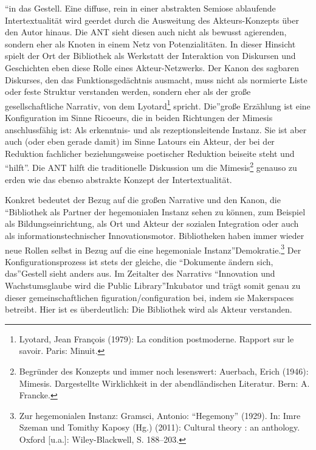 \enquote{in das Gestell. Eine diffuse, rein in einer abstrakten Semiose
ablaufende Intertextualität wird geerdet durch die Ausweitung des
Akteurs-Konzepts über den Autor hinaus. Die ANT sieht diesen auch nicht
als bewusst agierenden, sondern eher als Knoten in einem Netz von
Potenzialitäten. In dieser Hinsicht spielt der Ort der Bibliothek als
Werkstatt der Interaktion von Diskursen und Geschichten eben diese Rolle
eines Akteur-Netzwerks. Der Kanon des sagbaren Diskurses, den das
Funktionsgedächtnis ausmacht, muss nicht als normierte Liste oder feste
Struktur verstanden werden, sondern eher als der große gesellschaftliche
Narrativ, von dem Lyotard\footnote{Lyotard, Jean François (1979): La
  condition postmoderne. Rapport sur le savoir. Paris: Minuit.} spricht.
Die}große Erzählung ist eine Konfiguration im Sinne Ricoeurs, die in
beiden Richtungen der Mimesis anschlussfähig ist: Als erkenntnis- und
als rezeptionsleitende Instanz. Sie ist aber auch (oder eben gerade
damit) im Sinne Latours ein Akteur, der bei der Reduktion fachlicher
beziehungsweise poetischer Reduktion beiseite steht und \enquote{hilft}. Die ANT
hilft die traditionelle Diskussion um die Mimesis\footnote{Begründer des
  Konzepts und immer noch lesenswert: Auerbach, Erich (1946): Mimesis.
  Dargestellte Wirklichkeit in der abendländischen Literatur. Bern: A.
  Francke.} genauso zu erden wie das ebenso abstrakte Konzept der
Intertextualität.

Konkret bedeutet der Bezug auf die großen Narrative und den Kanon, die
\enquote{Bibliothek als Partner der hegemonialen Instanz sehen zu
können, zum Beispiel als Bildungseinrichtung, als Ort und Akteur der
sozialen Integration oder auch als informationstechnischer
Innovationsmotor. Bibliotheken haben immer wieder neue Rollen selbst in
Bezug auf die eine hegemoniale Instanz}Demokratie.\footnote{Zur
  hegemonialen Instanz: Gramsci, Antonio: \enquote{Hegemony} (1929). In:
  Imre Szeman und Tomithy Kaposy (Hg.) (2011): Cultural theory : an
  anthology. Oxford {[}u.a.{]}: Wiley-Blackwell, S. 188--203.} Der
Konfigurationsprozess ist stets der gleiche, die \enquote{Dokumente
ändern sich, das}Gestell sieht anders aus. Im Zeitalter des Narrativs
\enquote{Innovation und Wachstumsglaube wird die Public
Library}Inkubator und trägt somit genau zu dieser gemeinschaftlichen
figuration/configuration bei, indem sie Makerspaces betreibt. Hier ist
es überdeutlich: Die Bibliothek wird als Akteur verstanden.

